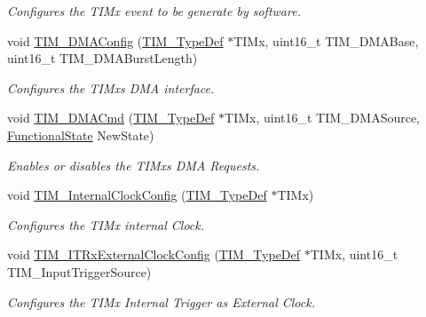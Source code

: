 \begin{DoxyCompactItemize}
\begin{DoxyCompactList}\small\item\em Configures the T\+I\+Mx event to be generate by software. \end{DoxyCompactList}\item 
void \mbox{\hyperlink{group___t_i_m___exported___functions_gad7156f84c436c8ac92cd789611826d09}{T\+I\+M\+\_\+\+D\+M\+A\+Config}} (\mbox{\hyperlink{struct_t_i_m___type_def}{T\+I\+M\+\_\+\+Type\+Def}} $\ast$T\+I\+Mx, uint16\+\_\+t T\+I\+M\+\_\+\+D\+M\+A\+Base, uint16\+\_\+t T\+I\+M\+\_\+\+D\+M\+A\+Burst\+Length)
\begin{DoxyCompactList}\small\item\em Configures the T\+I\+Mx\textquotesingle{}s D\+MA interface. \end{DoxyCompactList}\item 
void \mbox{\hyperlink{group___t_i_m___exported___functions_ga24700389cfa3ea9b42234933b23f1399}{T\+I\+M\+\_\+\+D\+M\+A\+Cmd}} (\mbox{\hyperlink{struct_t_i_m___type_def}{T\+I\+M\+\_\+\+Type\+Def}} $\ast$T\+I\+Mx, uint16\+\_\+t T\+I\+M\+\_\+\+D\+M\+A\+Source, \mbox{\hyperlink{group___exported__types_gac9a7e9a35d2513ec15c3b537aaa4fba1}{Functional\+State}} New\+State)
\begin{DoxyCompactList}\small\item\em Enables or disables the T\+I\+Mx\textquotesingle{}s D\+MA Requests. \end{DoxyCompactList}\item 
void \mbox{\hyperlink{group___t_i_m___exported___functions_ga2394f0221709c0659874f9a4184cf86e}{T\+I\+M\+\_\+\+Internal\+Clock\+Config}} (\mbox{\hyperlink{struct_t_i_m___type_def}{T\+I\+M\+\_\+\+Type\+Def}} $\ast$T\+I\+Mx)
\begin{DoxyCompactList}\small\item\em Configures the T\+I\+Mx internal Clock. \end{DoxyCompactList}\item 
void \mbox{\hyperlink{group___t_i_m___exported___functions_gabef227d21d9e121e6a4ec5ab6223f5a9}{T\+I\+M\+\_\+\+I\+T\+Rx\+External\+Clock\+Config}} (\mbox{\hyperlink{struct_t_i_m___type_def}{T\+I\+M\+\_\+\+Type\+Def}} $\ast$T\+I\+Mx, uint16\+\_\+t T\+I\+M\+\_\+\+Input\+Trigger\+Source)
\begin{DoxyCompactList}\small\item\em Configures the T\+I\+Mx Internal Trigger as External Clock. \end{DoxyCompactList}\item 

\end{DoxyCompactItemize}
